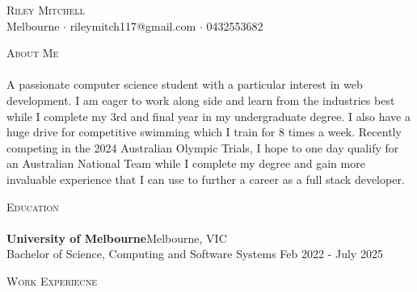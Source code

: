 \documentclass[a4paper]{article}
\newcommand{\lineunder} {
    \vspace*{-8pt} \\
    \hspace*{-18pt} \hrulefill \\
}
\newcommand{\header} [1] {
    {\hspace*{-18pt}\vspace*{6pt} \textsc{#1}}
    \vspace*{-6pt} \lineunder
}
\begin{document}
\vspace*{-40pt}

    

\vspace*{-10pt}
\begin{center}
	{\Huge \scshape {Riley Mitchell}}\\
	Melbourne $\cdot$ rileymitch117@gmail.com $\cdot$ 0432553682 \\
\end{center}

\header{About Me}
A passionate computer science student with a particular interest in web development. I am eager to work along side and learn from the industries best while I complete my 3rd and final year in my undergraduate degree. I also have a huge drive for competitive swimming which I train for 8 times a week. Recently competing in the 2024 Australian Olympic Trials, I hope to one day qualify for an Australian National Team while I complete my degree and gain more invaluable experience that I can use to further a career as a full stack developer.
\vspace{2mm}

\header{Education}
\textbf{University of Melbourne}\hfill Melbourne, VIC\\
Bachelor of Science, Computing and Software Systems \hfill Feb 2022 - July 2025\\
\vspace{2mm}

\header{Work Experiecne}
\vspace{1mm}
\end{document}
